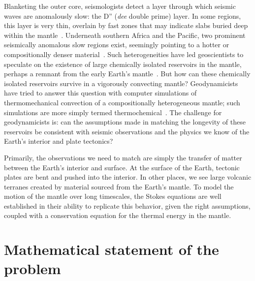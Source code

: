 Blanketing the outer core, seismologists detect a layer through which
seismic waves are anomalously slow: the D'' (\emph{dee} double prime) layer.
In some regions, this layer is very thin, overlain by fast zones that may
indicate slabs buried deep within the mantle~\citep{McNamaraZhong2005}.
Underneath southern Africa and the Pacific, two prominent seismically
anomalous slow regions exist, seemingly pointing to a hotter or
compositionally denser material~\citep{McNutt1998}. Such heterogeneities
have led geoscientists to speculate on the existence of large chemically
isolated reservoirs in the mantle, perhaps a remnant from the early
Earth's mantle~\citep{Burke2008}.  But how can these chemically
isolated reservoirs survive in a vigorously convecting mantle?
Geodynamicists have tried to answer this question with computer
simulations of thermomechanical convection of a compositionally
heterogeneous mantle; such simulations are more simply termed
thermochemical~\citep{McNamara2010}. The challenge for geodynamicists is:
can the assumptions made in matching the longevity of these reservoirs
be consistent with seismic observations and the physics we know of the
Earth's interior and plate tectonics?

Primarily, the observations we need to match are simply the transfer of
matter between the Earth's interior and surface. At the surface of the
Earth, tectonic plates are bent and pushed into the interior. In other
places, we see large volcanic terranes created by material sourced
from the Earth's mantle. To model the motion of the mantle over long
timescales, the Stokes equations are well established in their ability
to replicate this behavior, given the right assumptions, coupled with
a conservation equation for the thermal energy in the mantle.


\section{Mathematical statement of the problem}
\label{vynnytska:sec:maths}

